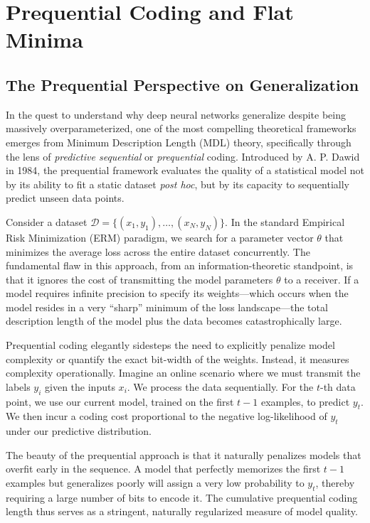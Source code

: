 \chapter{Prequential Coding and Flat Minima}
\label{ch:prequential}

\section{The Prequential Perspective on Generalization}

In the quest to understand why deep neural networks generalize despite being massively overparameterized, one of the most compelling theoretical frameworks emerges from Minimum Description Length (MDL) theory, specifically through the lens of \emph{predictive sequential} or \emph{prequential} coding. Introduced by A. P. Dawid in 1984, the prequential framework evaluates the quality of a statistical model not by its ability to fit a static dataset \emph{post hoc}, but by its capacity to sequentially predict unseen data points. 

Consider a dataset $\mathcal{D} = \{(x_1, y_1), \dots, (x_N, y_N)\}$. In the standard Empirical Risk Minimization (ERM) paradigm, we search for a parameter vector $\theta$ that minimizes the average loss across the entire dataset concurrently. The fundamental flaw in this approach, from an information-theoretic standpoint, is that it ignores the cost of transmitting the model parameters $\theta$ to a receiver. If a model requires infinite precision to specify its weights---which occurs when the model resides in a very ``sharp'' minimum of the loss landscape---the total description length of the model plus the data becomes catastrophically large. 

Prequential coding elegantly sidesteps the need to explicitly penalize model complexity or quantify the exact bit-width of the weights. Instead, it measures complexity operationally. Imagine an online scenario where we must transmit the labels $y_i$ given the inputs $x_i$. We process the data sequentially. For the $t$-th data point, we use our current model, trained on the first $t-1$ examples, to predict $y_t$. We then incur a coding cost proportional to the negative log-likelihood of $y_t$ under our predictive distribution. 

The beauty of the prequential approach is that it naturally penalizes models that overfit early in the sequence. A model that perfectly memorizes the first $t-1$ examples but generalizes poorly will assign a very low probability to $y_t$, thereby requiring a large number of bits to encode it. The cumulative prequential coding length thus serves as a stringent, naturally regularized measure of model quality. 

